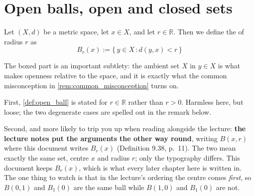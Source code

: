 
\section{Open balls, open and closed sets}
\label{sec:open_closed_sets}

\begin{definition}
\label{def:open_ball}
Let $(X,d)$ be a metric space, let $x \in X$, and let $r \in \mathbb{R}$. Then we define the
 of radius $r$ as
\[B_r(x) := \{\,\boxed{y \in X}\, : d(y,x) < r\,\}\]
\end{definition}

\begin{importantremark}
The boxed part is an important subtlety: the ambient set $X$ in
$y \in X$ is what makes openness relative to the space, and it is exactly what the common
misconception in \cref{rem:common_misconception} turns on.
\end{importantremark}

\begin{ainote}
\label{ainote:ball_notation}
First, \cref{def:open_ball} is stated for $r \in \mathbb{R}$ rather than $r > 0$. Harmless here,
but loose; the two degenerate cases are spelled out in the remark below.

Second, and more likely to trip you up when reading alongside the lecture: \textbf{the lecture
notes put the arguments the other way round}, writing $B(x,r)$ where this document writes
$B_r(x)$ (Definition 9.38, p.\ 11). The two mean exactly the same set, centre $x$ and radius $r$;
only the typography differs. This document keeps $B_r(x)$, which is what every later chapter here
is written in. The one thing to watch is that in the
lecture's ordering the centre comes \emph{first}, so $B(0,1)$ and $B_1(0)$ are the same ball
while $B(1,0)$ and $B_1(0)$ are not.
\end{ainote}

